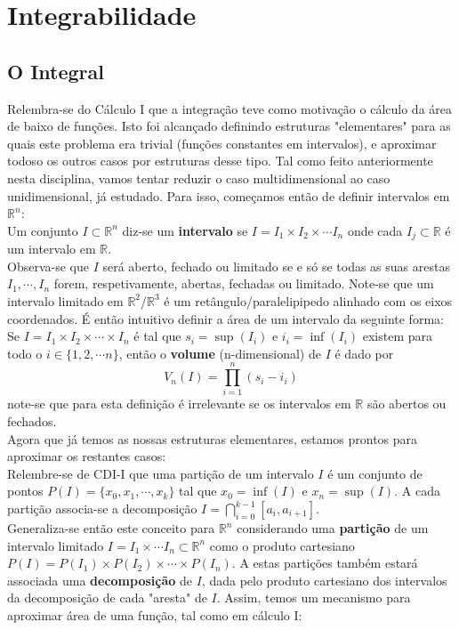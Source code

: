 \documentclass{article}
\begin{document}
\section{Integrabilidade}

\subsection{O Integral}
Relembra-se do Cálculo I que a integração teve como motivação o cálculo da área de baixo de funções. Isto foi alcançado definindo estruturas "elementares" para as quais este problema era trivial (funções constantes em intervalos), e aproximar todoso os outros casos por estruturas desse tipo. Tal como feito anteriormente nesta disciplina, vamos tentar reduzir o caso multidimensional ao caso unidimensional, já estudado. Para isso, começamos então de definir intervalos em $\mathbb{R}^n$:\\
Um conjunto $I \subset \mathbb{R}^n$ diz-se um \textbf{intervalo} se $I = I_1 \times I_2 \times \cdots I_n$ onde cada $I_j \subset \mathbb{R}$ é um intervalo em $\mathbb{R}$.\\
Observa-se que $I$ será aberto, fechado ou limitado se e só se todas as suas arestas $I_1, \cdots, I_n$ forem, respetivamente, abertas, fechadas ou limitado.
Note-se que um intervalo limitado em $\mathbb{R}^2$/$\mathbb{R}^3$ é um retângulo/paralelipipedo alinhado com os eixos coordenados. É então intuitivo definir a área de um intervalo da seguinte forma:\\
Se $I = I_1 \times I_2 \times \cdots \times I_n$ é tal que $s_i = \sup(I_i)$ e $i_i = \inf(I_i)$ existem para todo o $i \in \{1,2,\cdots n\}$, então o \textbf{volume} (n-dimensional) de $I$ é dado por
$$
V_n(I) = \prod_{i=1}^n (s_i-i_i)
$$
note-se que para esta definição é irrelevante se os intervalos em $\mathbb{R}$ são abertos ou fechados.\\
Agora que já temos as nossas estruturas elementares, estamos prontos para aproximar os restantes casos:\\
Relembre-se de CDI-I que uma partição de um intervalo $I$ é um conjunto de pontos $P(I) = \{ x_0, x_1, \cdots, x_k \}$ tal que $x_0 = \inf(I)$ e $x_n = \sup(I)$. A cada partição associa-se a decomposição $I = \bigcap_{i=0}^{k-1} [a_i, a_{i+1}]$.\\
Generaliza-se então este conceito para $\mathbb{R}^n$ considerando uma \textbf{partição} de um intervalo limitado $I = I_1 \times \cdots I_n \subset \mathbb{R}^n$ como o produto cartesiano $P(I) = P(I_1) \times P(I_2) \times \cdots \times P(I_n)$. A estas partições também estará associada uma \textbf{decomposição} de $I$, dada pelo produto cartesiano dos intervalos da decomposição de cada "aresta" de $I$. Assim, temos um mecanismo para aproximar área de uma função, tal como em cálculo I:\\
\end{document}
